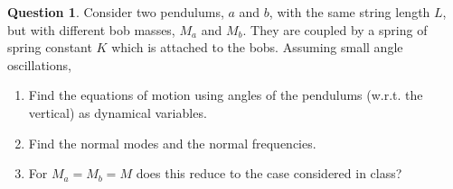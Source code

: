 \documentclass[10pt]{scrartcl}
\theoremstyle{definition}
\newtheorem{exercise}{Question}
\begin{document}
\begin{exercise}
    Consider two pendulums, $a$ and $b$, with the same string length $L$, but with different bob masses, $M_a$ and $M_b$. They are coupled by a spring of spring constant $K$ which 
    is attached to the bobs. Assuming small angle oscillations,
    \begin{enumerate}[label={(\alph*)}]
        \item Find the equations of motion using angles of the pendulums (w.r.t. the vertical) as dynamical variables.
        \item Find the normal modes and the normal frequencies.
        \item For $M_a = M_b = M$ does this reduce to the case considered in class?
    \end{enumerate}
\end{exercise}
\end{document}
